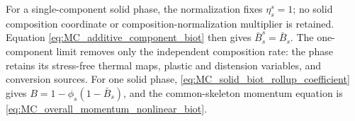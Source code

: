 %
For a single-component solid phase, the normalization fixes
\(\eta_s^s=1\); no solid composition coordinate or
composition-normalization multiplier is retained.  Equation
\eqref{eq:MC_additive_component_biot} then gives
\(\bar B_s^s=\bar B_s\).  The one-component limit removes only the
independent composition rate: the phase retains its stress-free thermal maps,
plastic and distension variables, and conversion sources.  For one solid
phase, \eqref{eq:MC_solid_biot_rollup_coefficient} gives
\(B=1-\phi_s(1-\bar B_s)\), and the common-skeleton momentum equation is
\eqref{eq:MC_overall_momentum_nonlinear_biot}.
\FloatBarrier
